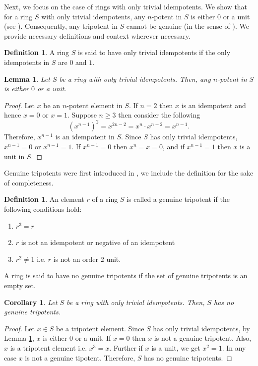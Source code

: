 \documentclass[12pt]{amsart}
\newtheorem{lem}[theorem]{Lemma}
\newtheorem{cor}[theorem]{Corollary}
\theoremstyle{definition}
\newtheorem{definition}[theorem]{Definition}
\numberwithin{equation}{section}
\begin{document}
Next, we focus on the case of rings with only trivial idempotents. We show that for a ring $S$ with only trivial idempotents, any $n$-potent in $S$ is either $0$ or a unit (see ). Consequently, any tripotent in $S$ cannot be genuine (in the sense of \cite{cualuguareanu2018tripotents}). We provide necessary definitions and context wherever necessary. 
\begin{definition}\label{DEF: Ring with only trivial Idempotents}
    A ring $S$ is said to have only trivial idempotents if the only idempotents in $S$ are $0$ and $1$. 
\end{definition}
\begin{lem}\label{LEM: n-potents in rings with only trivial idempotents}
    Let $S$ be a ring with only trivial idempotents. Then, any $n$-potent in $S$ is either $0$ or a unit. 
\end{lem}
\begin{proof}
Let $x$ be an $n$-potent element in $S$. If $n=2
$ then $x$ is an idempotent and hence $x=0 \text{ or } x=1$. Suppose $n \geq 3$ then consider the following 
$$(x^{n-1})^2=x^{2n-2}=x^n\cdot x^{n-2}=x^{n-1}.$$
Therefore, $x^{n-1}$ is an idempotent in $S$. Since $S$ has only trivial idempotents, $x^{n-1}=0$ or $x^{n-1}=1$. If $x^{n-1}=0$ then $x^n=x=0$, and if $x^{n-1}=1$ then $x$ is a unit in $S$.
\end{proof}
\noindent Genuine tripotents were first introduced in \cite[Section~1]{cualuguareanu2018tripotents}, we include the definition for the sake of completeness. 
\begin{definition}\label{DEF: Genuine Tripotents}
    An element $r$ of a ring $S$ is called a genuine tripotent if the  following conditions hold:
    \begin{enumerate}
        \item $r^3=r$
        \item $r$ is not an idempotent or negative of an idempotent
        \item $r^2 \neq 1$ i.e. $r$ is not an order $2$ unit. 
        \end{enumerate}
       A ring is said to have no genuine tripotents if the set of genuine tripotents is an empty set.\end{definition} 

\begin{cor}\cite[Remarks]{cualuguareanu2018tripotents}\label{Cor: Ring with only trivial idempotents has no genuine tripotents}
    Let $S$ be a ring with only trivial idempotents. Then, $S$ has no genuine tripotents. 
\end{cor}
\begin{proof}
 Let $x \in S$ be a tripotent element. Since $S$ has only trivial idempotents, by Lemma \ref{LEM: n-potents in rings with only trivial idempotents}, $x$ is either $0$ or a unit. If $x=0$ then $x$ is not a genuine tripotent. Also, $x$ is a tripotent element i.e. $x^3=x$. Further if $x$ is a unit, we get $x^2=1$. In any case $x$ is not a genuine tipotent. Therefore, $S$ has no genuine tripotents. 
\end{proof}
\end{document}

